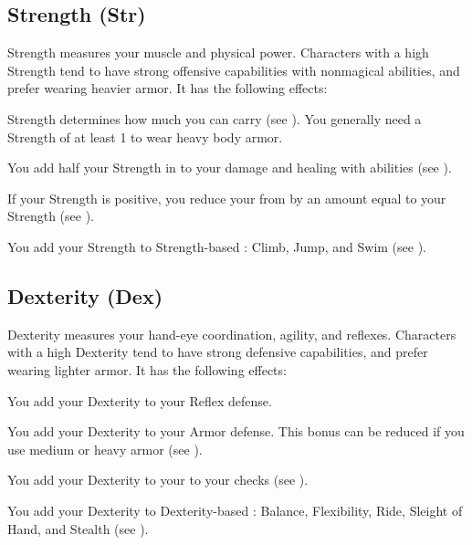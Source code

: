     \subsection{Strength (Str)}\label{Strength}
        {
            Strength measures your muscle and physical power.
            Characters with a high Strength tend to have strong offensive capabilities with nonmagical abilities, and prefer wearing heavier armor.
            It has the following effects:
            \begin{raggeditemize}
                \item Strength determines how much you can carry (see ).
                    You generally need a Strength of at least 1 to wear heavy body armor.
                \item You add half your Strength in  to your damage and healing with  abilities (see ).
                \item If your Strength is positive, you reduce your  from  by an amount equal to your Strength (see ).
                \item You add your Strength to Strength-based : Climb, Jump, and Swim (see ).
            \end{raggeditemize}
        }

    \subsection{Dexterity (Dex)}\label{Dexterity}
        {
            Dexterity measures your hand-eye coordination, agility, and reflexes.
            Characters with a high Dexterity tend to have strong defensive capabilities, and prefer wearing lighter armor.
            It has the following effects:
            \begin{raggeditemize}
                \item You add your Dexterity to your Reflex defense.
                \item You add your Dexterity to your Armor defense.
                    This bonus can be reduced if you use medium or heavy armor (see ).
                \item You add your Dexterity to your to your  checks (see ).
                \item You add your Dexterity to Dexterity-based : Balance, Flexibility, Ride, Sleight of Hand, and Stealth (see ).
            \end{raggeditemize}
        }

